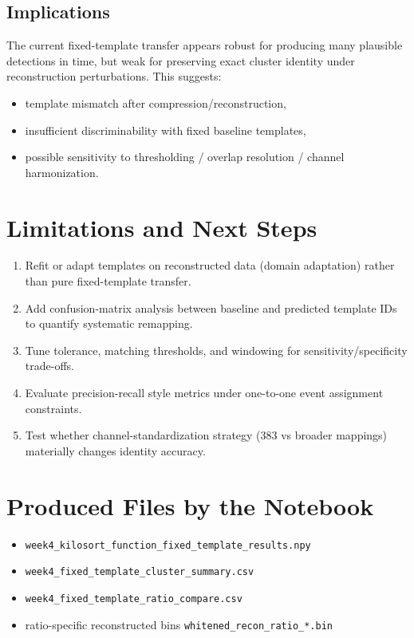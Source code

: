 ﻿\documentclass[11pt]{article}
\begin{document}
\subsection{Implications}
The current fixed-template transfer appears robust for producing many plausible detections in time, but weak for preserving exact cluster identity under reconstruction perturbations. This suggests:
\begin{itemize}
  \item template mismatch after compression/reconstruction,
  \item insufficient discriminability with fixed baseline templates,
  \item possible sensitivity to thresholding / overlap resolution / channel harmonization.
\end{itemize}

\section{Limitations and Next Steps}
\begin{enumerate}
  \item Refit or adapt templates on reconstructed data (domain adaptation) rather than pure fixed-template transfer.
  \item Add confusion-matrix analysis between baseline and predicted template IDs to quantify systematic remapping.
  \item Tune tolerance, matching thresholds, and windowing for sensitivity/specificity trade-offs.
  \item Evaluate precision-recall style metrics under one-to-one event assignment constraints.
  \item Test whether channel-standardization strategy (383 vs broader mappings) materially changes identity accuracy.
\end{enumerate}

\section{Produced Files by the Notebook}
\begin{itemize}
  \item \texttt{week4\_kilosort\_function\_fixed\_template\_results.npy}
  \item \texttt{week4\_fixed\_template\_cluster\_summary.csv}
  \item \texttt{week4\_fixed\_template\_ratio\_compare.csv}
  \item ratio-specific reconstructed bins \texttt{whitened\_recon\_ratio\_*.bin}
\end{itemize}
\end{document}
